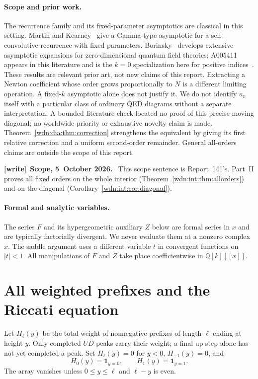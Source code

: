 \documentclass[11pt,letterpaper]{article}
\theoremstyle{remark}\newtheorem{remark}[theorem]{Remark}
\newcommand{\Q}{\mathbb Q}
\newenvironment{writenote}[1][]{\par\smallskip\begingroup\small
 \noindent\textbf{[write]}\if\relax\detokenize{#1}\relax\else~\textbf{#1.}\fi\ }%
 {\par\endgroup\smallskip}
\begin{document}
\paragraph{Scope and prior work.}
The recurrence family and its fixed-parameter asymptotics are classical in
this setting. Martin and Kearney~\cite[Section 2.4, Theorem 3]{MK} give a
Gamma-type asymptotic for a self-convolutive recurrence with fixed parameters.
Borinsky~\cite[Section 6.4.1 and Table 10]{Borinsky} develops extensive
asymptotic expansions for zero-dimensional quantum field theories; A005411
appears in this literature and is the $k=0$ specialization here for positive
indices~\cite{A005411}. These results are relevant prior art, not new claims
of this report. Extracting a Newton coefficient whose order grows
proportionally to $N$ is a different limiting operation. A fixed-$k$
asymptotic alone does not justify it. We do not identify $a_n$ itself with a
particular class of ordinary QED diagrams without a separate interpretation.
A bounded literature check located no proof of this precise moving diagonal;
no worldwide priority or exhaustive novelty claim is made.
Theorem~\ref{wdn:dia:thm:correction} strengthens the equivalent by giving its first
relative correction and a uniform second-order remainder. General all-orders
claims are outside the scope of this report.

\begin{writenote}[Scope, 5~October 2026]
This scope sentence is Report~141's. Part~II proves all fixed orders on the whole interior (Theorem~\ref{wdn:int:thm:allorders}) and on the diagonal (Corollary~\ref{wdn:int:cor:diagonal}).
\end{writenote}

\paragraph{Formal and analytic variables.}
The series $F$ and its hypergeometric auxiliary $Z$ below are formal series
in $x$ and are typically factorially divergent. We never evaluate them at a
nonzero complex $x$. The saddle argument uses a different variable $t$ in
convergent functions on $|t|<1$. All manipulations of $F$ and $Z$ take place
coefficientwise in $\Q[k][[x]]$.

\section{All weighted prefixes and the Riccati equation}\label{wdn:dia:sec:bridge}
Let $H_\ell(y)$ be the total weight of nonnegative prefixes of length
$\ell$ ending at height $y$. Only completed $UD$ peaks carry their weight;
a final up-step alone has not yet completed a peak. Set $H_\ell(y)=0$ for
$y<0$, $H_{-1}(y)=0$, and
\[
 H_0(y)=\mathbf1_{y=0},\qquad H_1(y)=\mathbf1_{y=1}.
\]
The array vanishes unless $0\le y\le\ell$ and $\ell-y$ is even.
\end{document}
